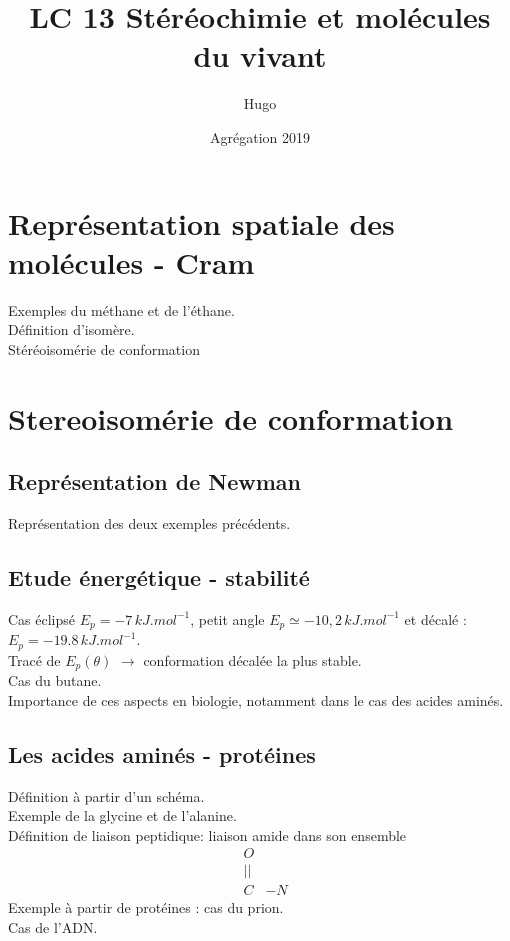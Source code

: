 \documentclass[12pt,prb,aps,epsf]{article}
\begin{document}
	
	\title{LC 13 Stéréochimie et molécules du vivant}
	\author{Hugo}
	\date{Agrégation 2019}
	\maketitle
	
	\tableofcontents
	
	\pagebreak
	
\section{Représentation spatiale des molécules - Cram}
	Exemples du méthane et de l'éthane.\\
	Définition d'isomère.\\
	Stéréoisomérie de conformation\\
	
\section{Stereoisomérie de conformation}
\subsection{Représentation de Newman}
Représentation des deux exemples précédents.

\subsection{Etude énergétique - stabilité}
Cas éclipsé $E_p = -7\,kJ.mol^{-1}$, petit angle $E_p \simeq -10,2\,kJ.mol^{-1}$ et décalé : $E_p = -19.8\, kJ.mol^{-1}$.\\
Tracé de $E_p(\theta)$ $\rightarrow$ conformation décalée la plus stable.\\
Cas du butane.\\
Importance de ces aspects en biologie, notamment dans le cas des acides aminés.

\subsection{Les acides aminés - protéines}
Définition à partir d'un schéma.\\
Exemple de la glycine et de l'alanine.\\
Définition de liaison peptidique: liaison amide dans son ensemble
\begin{eqnarray}
&O&\\
&||&\\
&C& -N
\end{eqnarray}
Exemple à partir de protéines : cas du prion.\\
Cas de l'ADN.
\end{document}
